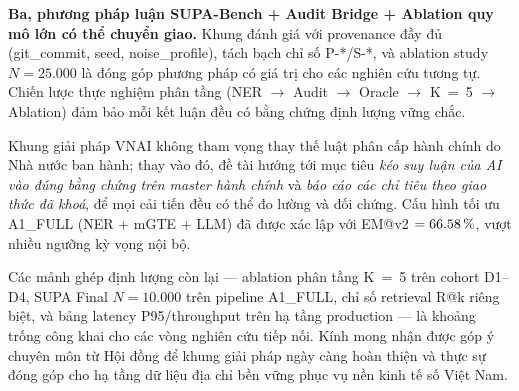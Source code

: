 \textbf{Ba, phương pháp luận SUPA-Bench + Audit Bridge + Ablation quy mô lớn có thể chuyển giao.} Khung đánh giá với provenance đầy đủ (git\_commit, seed, noise\_profile), tách bạch chỉ số P-*/S-*, và ablation study \(N = 25.000\) là đóng góp phương pháp có giá trị cho các nghiên cứu tương tự. Chiến lược thực nghiệm phân tầng (NER \(\to\) Audit \(\to\) Oracle \(\to\) K~=~5 \(\to\) Ablation) đảm bảo mỗi kết luận đều có bằng chứng định lượng vững chắc.

Khung giải pháp VNAI không tham vọng thay thế luật phân cấp hành chính do Nhà nước ban hành; thay vào đó, đề tài hướng tới mục tiêu \emph{kéo suy luận của AI vào đúng bằng chứng trên master hành chính} và \emph{báo cáo các chỉ tiêu theo giao thức đã khoá}, để mọi cải tiến đều có thể đo lường và đối chứng. Cấu hình tối ưu A1\_FULL (NER + mGTE + LLM) đã được xác lập với EM@v2 \(= 66.58\,\%\), vượt nhiều ngưỡng kỳ vọng nội bộ.

Các mảnh ghép định lượng còn lại --- ablation phân tầng K~=~5 trên cohort D1--D4, SUPA Final \(N = 10.000\) trên pipeline A1\_FULL, chỉ số retrieval R@k riêng biệt, và bảng latency P95/throughput trên hạ tầng production --- là khoảng trống công khai cho các vòng nghiên cứu tiếp nối. Kính mong nhận được góp ý chuyên môn từ Hội đồng để khung giải pháp ngày càng hoàn thiện và thực sự đóng góp cho hạ tầng dữ liệu địa chỉ bền vững phục vụ nền kinh tế số Việt Nam.
